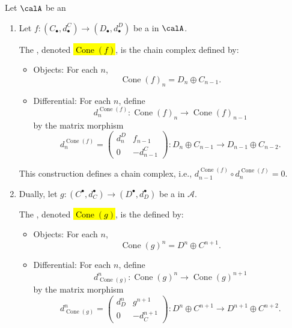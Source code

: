 \begin{definition} \label{definition:mapping_cone_of_a_map_of_chain_cochain_complexes_in_an_additive_category}
    Let $\calA$ be an 
    \begin{enumerate}
        \item Let $f : (C_\bullet, d^C_\bullet) \to (D_\bullet, d^D_\bullet)$ be a  in $\calA$.

        The , denoted \hl{$\operatorname{Cone}(f)$}, is the chain complex defined by:
        \begin{itemize}
        \item Objects: For each $n$, 
        $$\operatorname{Cone}(f)_n = D_n \oplus C_{n-1}.$$
        \item Differential: For each $n$, define
        $$d^{\operatorname{Cone}(f)}_n : \operatorname{Cone}(f)_n \to \operatorname{Cone}(f)_{n-1}$$
        by the matrix morphism
        $$d^{\operatorname{Cone}(f)}_n = \begin{pmatrix} d^D_n & f_{n-1} \\ 0 & -d^C_{n-1} \end{pmatrix} : D_n \oplus C_{n-1} \to D_{n-1} \oplus C_{n-2}.$$
        \end{itemize}

        This construction defines a chain complex, i.e., $d^{\operatorname{Cone}(f)}_{n-1} \circ d^{\operatorname{Cone}(f)}_n = 0$.

        \item Dually, let $g : (C^\bullet, d_C^\bullet) \to (D^\bullet, d_D^\bullet)$ be a  in $\mathcal{A}$. 

        The , denoted \hl{$\operatorname{Cone}(g)$}, is the  defined by:
        \begin{itemize}
        \item Objects: For each $n$, 
        $$\operatorname{Cone}(g)^n = D^n \oplus C^{n+1}.$$
        \item Differential: For each $n$, define
        $$d_{\operatorname{Cone}(g)}^n : \operatorname{Cone}(g)^n \to \operatorname{Cone}(g)^{n+1}$$
        by the matrix morphism
        $$d_{\operatorname{Cone}(g)}^n = \begin{pmatrix} d_D^n & g^{n+1} \\ 0 & -d_C^{n+1} \end{pmatrix} : D^n \oplus C^{n+1} \to D^{n+1} \oplus C^{n+2}.$$
        \end{itemize}


\end{enumerate}
\end{definition}
